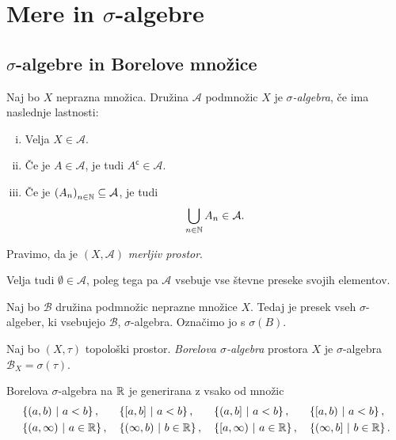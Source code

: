 \section{Mere in \texorpdfstring{$\sigma$}{sigma}-algebre}

\subsection{\texorpdfstring{$\sigma$}{Sigma}-algebre in Borelove množice}


\begin{definicija}
Naj bo $X$ neprazna množica. Družina $\mathcal{A}$ podmnožic $X$ je
\emph{$\sigma$-algebra}, če
ima naslednje lastnosti:

\begin{enumerate}[i)]
\item Velja $X \in \mathcal{A}$.
\item Če je $A \in \mathcal{A}$, je tudi
$A^{\mathsf{c}} \in \mathcal{A}$.
\item Če je $\left(A_n\right)_{n \in \mathbb{N}} \subseteq \mathcal{A}$, je tudi
\[
\bigcup_{n \in \mathbb{N}} A_n \in \mathcal{A}.
\]
\end{enumerate}

Pravimo, da je $(X, \mathcal{A})$
\emph{merljiv prostor}.
\end{definicija}

\begin{opomba}
Velja tudi $\emptyset \in \mathcal{A}$, poleg tega pa $\mathcal{A}$
vsebuje vse števne preseke svojih elementov.
\end{opomba}

\begin{trditev}
Naj bo $\mathcal{B}$ družina podmnožic neprazne množice $X$. Tedaj
je presek vseh $\sigma$-algeber, ki vsebujejo $\mathcal{B}$,
$\sigma$-algebra. Označimo jo s $\sigma(B)$.
\end{trditev}

\obvs

\begin{definicija}
Naj bo $(X, \tau)$ topološki prostor.
\emph{Borelova $\sigma$-algebra}
prostora $X$ je $\sigma$-algebra $\mathcal{B}_X = \sigma(\tau)$.
\end{definicija}

\begin{trditev}
Borelova $\sigma$-algebra na $\mathbb{R}$ je generirana z vsako od množic
\begin{align*}
&\left\{(a,b)~\middle\vert~a < b\right\}, &
&\left\{[a,b]~\middle\vert~a < b\right\}, &
&\left\{(a,b]~\middle\vert~a < b\right\}, &
&\left\{[a,b)~\middle\vert~a < b\right\}, \\
&\left\{(a,\infty)~\middle\vert~a \in \mathbb{R}\right\}, &
&\left\{(\infty,b)~\middle\vert~b \in \mathbb{R}\right\}, &
&\left\{[a,\infty)~\middle\vert~a \in \mathbb{R}\right\}, &
&\left\{(\infty,b]~\middle\vert~b \in \mathbb{R}\right\}.
\end{align*}
\end{trditev}

